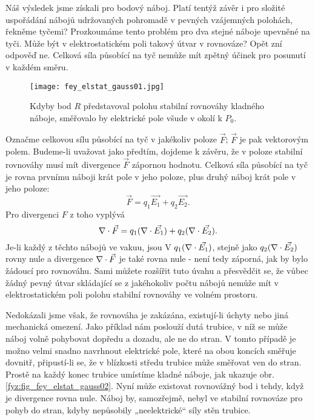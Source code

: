      Náš výsledek jsme získali pro bodový náboj. Platí tentýž závěr i pro složité uspořádání nábojů 
      udržovaných pohromadě v pevných vzájemných polohách, řekněme tyčemi? Prozkoumáme tento problém pro dva 
      stejné náboje upevněné na tyči. Může být v elektrostatickém poli takový útvar v rovnováze? Opět zní 
      odpověď ne. Celková síla působící na tyč nemůže mít zpětný účinek pro posunutí v každém směru.
      \begin{wrapfigure}{r}{0.5\linewidth} %
        \centering
        \texttt{[image: fey\_elstat\_gauss01.jpg]}
        \caption{Kdyby bod \(R\) představoval polohu stabilní rovnováhy kladného náboje, směřovalo by   
                 elektrické pole všude v okolí k \(P_0\).}
        \label{fyz:fig_fey_elstat_gauss01}
      \end{wrapfigure} 
      
      Označme celkovou sílu působící na tyč v jakékoliv poloze \(\vec{F}\); \(\vec{F}\) je pak vektorovým	
      polem. Budeme-li uvažovat jako předtím, dojdeme k závěru, že v poloze stabilní rovnováhy musí mít
      divergence \(\vec{F}\) zápornou hodnotu. Celková síla působící na tyč je rovna prvnímu náboji krát pole 
      v jeho poloze, plus druhý náboj krát pole v jeho poloze: \[\vec{F}=q_1\vec{E_1} + q_2\vec{E_2}.\] Pro 
      divergenci \(F\) z toho vyplývá \[\nabla\cdot\vec{F}=q_1(\nabla\cdot\vec{E_1}) + q_2(\nabla\cdot\vec{E_2}).\] Je-li každý z 
      těchto nábojů ve vakuu, jsou V \(q_1(\nabla\cdot\vec{E_1})\), stejně jako \(q_2(\nabla\cdot\vec{E_2})\) rovny nule a 
      divergence \(\nabla\cdot\vec{F}\) je také rovna nule - není tedy záporná, jak by bylo žádoucí pro rovnováhu. 
      Sami můžete rozšířit tuto úvahu a přesvědčit se, že vůbec žádný pevný útvar skládající se z jakéhokoliv 
      počtu nábojů nemůže mít v elektrostatickém poli polohu stabilní rovnováhy ve volném prostoru.
      
      Nedokázali jsme však, že rovnováha je zakázána, existují-li úchyty nebo jiná mechanická omezení. Jako 
      příklad nám poslouží dutá trubice, v níž se může náboj volně pohybovat dopředu a dozadu, ale ne do 
      stran. V tomto případě je možno velmi snadno navrhnout elektrické pole, které na obou koncích směřuje 
      dovnitř, připustí-li se, že v blízkosti středu trubice může směřovat ven do stran. Prostě na každý 
      konec trubice umístíme kladné náboje, jak ukazuje obr. \ref{fyz:fig_fey_elstat_gauss02}. Nyní může 
      existovat rovnovážný bod i tehdy, když je divergence rovna nule. Náboj by, samozřejmě, nebyl ve 
      stabilní rovnováze pro pohyb do stran, kdyby nepůsobily „neelektrické“ síly stěn trubice. 
      
